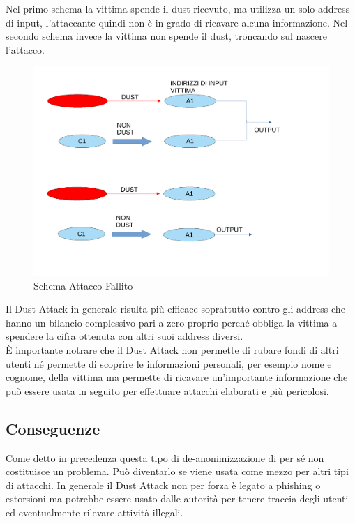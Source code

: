 Nel primo schema la vittima spende il dust ricevuto, ma utilizza un solo address di input, l'attaccante quindi non è in grado di ricavare alcuna informazione. Nel secondo schema invece la vittima non spende il dust, troncando sul nascere l'attacco. 
\begin{figure}[h!]
    \centering
    \includegraphics[scale=0.5]{Images/fallimento.pdf}
    \caption{Schema Attacco Fallito}
    \label{fig:fallito}
\end{figure}
\FloatBarrier
Il Dust Attack in generale risulta più efficace soprattutto contro gli address che hanno un bilancio complessivo pari a zero proprio perché obbliga la vittima a spendere la cifra ottenuta con altri suoi address diversi.\\

È importante notrare che il Dust Attack non permette di rubare fondi di altri utenti né permette di scoprire le informazioni personali, per esempio nome e cognome, della vittima ma permette di ricavare un'importante informazione che può essere usata in seguito per effettuare attacchi elaborati e più pericolosi.
\subsection{Conseguenze}\label{Conseguenze}
Come detto in precedenza questa tipo di de-anonimizzazione di per sé non costituisce un problema. Può diventarlo se viene usata come mezzo per altri tipi di attacchi. In generale il Dust Attack non per forza è legato a phishing o estorsioni ma potrebbe essere usato dalle autorità per tenere traccia degli utenti ed eventualmente rilevare attività illegali.

